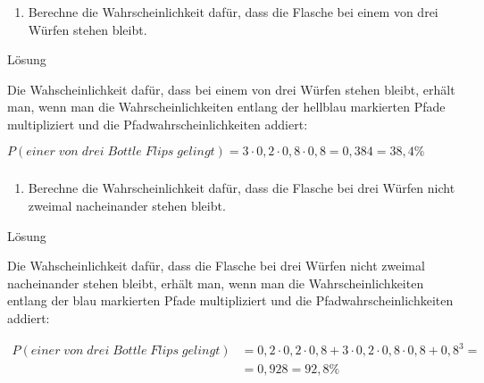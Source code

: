 \documentclass[
  ngerman,
]{book}
\providecommand{\tightlist}{%
  \setlength{\itemsep}{0pt}\setlength{\parskip}{0pt}}
\begin{document}
\hypertarget{section-145}{%
\subsubsection*{}\label{section-145}}

\begin{enumerate}
\def\labelenumi{\alph{enumi})}
\setcounter{enumi}{2}
\tightlist
\item
  Berechne die Wahrscheinlichkeit dafür, dass die Flasche bei einem von drei Würfen stehen bleibt.
\end{enumerate}

Lösung

Die Wahscheinlichkeit dafür, dass bei einem von drei Würfen stehen bleibt, erhält man, wenn man die Wahrscheinlichkeiten entlang der hellblau markierten Pfade multipliziert und die Pfadwahrscheinlichkeiten addiert:

\(P(einer\;von\;drei\;Bottle\;Flips\;gelingt)= 3 \cdot 0,2 \cdot 0,8 \cdot 0,8 = 0,384 =38,4\%\)

\hypertarget{section-146}{%
\subsubsection*{}\label{section-146}}

\begin{enumerate}
\def\labelenumi{\alph{enumi})}
\setcounter{enumi}{3}
\tightlist
\item
  Berechne die Wahrscheinlichkeit dafür, dass die Flasche bei drei Würfen nicht zweimal nacheinander stehen bleibt.
\end{enumerate}

Lösung

Die Wahscheinlichkeit dafür, dass die Flasche bei drei Würfen nicht zweimal nacheinander stehen bleibt, erhält man, wenn man die Wahrscheinlichkeiten entlang der blau markierten Pfade multipliziert und die Pfadwahrscheinlichkeiten addiert:

\[\begin{align} P(einer\;von\;drei\;Bottle\;Flips\;gelingt) &= 0,2 \cdot 0,2 \cdot 0,8 + 3 \cdot 0,2 \cdot 0,8 \cdot 0,8 + 0,8^3 = \\ &= 0,928 = 92,8\%\end{align}\]

\hypertarget{section-147}{%
\subsubsection*{}\label{section-147}}
\end{document}
